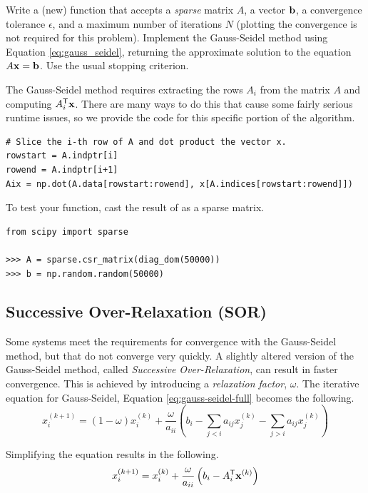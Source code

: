 \begin{problem} %
Write a (new) function that accepts a \emph{sparse} matrix $A$, a vector $\mathbf{b}$, a convergence tolerance $\epsilon$, and a maximum number of iterations $N$ (plotting the convergence is not required for this problem).
Implement the Gauss-Seidel method using Equation \ref{eq:gauss_seidel}, returning the approximate solution to the equation $A\mathbf{x} = \mathbf{b}$.
Use the usual stopping criterion.

The Gauss-Seidel method requires extracting the rows $A_i$ from the matrix $A$ and computing $A_i^{\mathsf T}\mathbf{x}$.
There are many ways to do this that cause some fairly serious runtime issues, so we provide the code for this specific portion of the algorithm.

\begin{lstlisting}
# Slice the i-th row of A and dot product the vector x.
rowstart = A.indptr[i]
rowend = A.indptr[i+1]
Aix = np.dot(A.data[rowstart:rowend], x[A.indices[rowstart:rowend]])
\end{lstlisting}

To test your function, cast the result of  as a sparse matrix.

\begin{lstlisting}
from scipy import sparse

>>> A = sparse.csr_matrix(diag_dom(50000))
>>> b = np.random.random(50000)
\end{lstlisting}
\end{problem}

\subsection*{Successive Over-Relaxation (SOR)} %

Some systems meet the requirements for convergence with the Gauss-Seidel method, but that do not converge very quickly.
A slightly altered version of the Gauss-Seidel method, called \emph{Successive Over-Relaxation}, can result in faster convergence.
This is achieved by introducing a \emph{relaxation factor}, $\omega$.
The iterative equation for Gauss-Seidel, Equation \ref{eq:gauss-seidel-full} becomes the following.
\[x^{(k+1)}_i = (1-\omega)x^{(k)}_i + \frac{\omega}{a_{ii}} \left(b_i - \sum_{j < i}a_{ij}x^{(k)}_j - \sum_{j > i}a_{ij}x^{(k)}_j \right)\]

Simplifying the equation results in the following.
\begin{equation}
x^{(k+1)}_i = x^{(k)}_i + \frac{\omega}{a_{ii}}\left( b_i - A_i^{\mathsf T}\mathbf{x}^{(k)}\right)
\label{eq:sor}
\end{equation}

